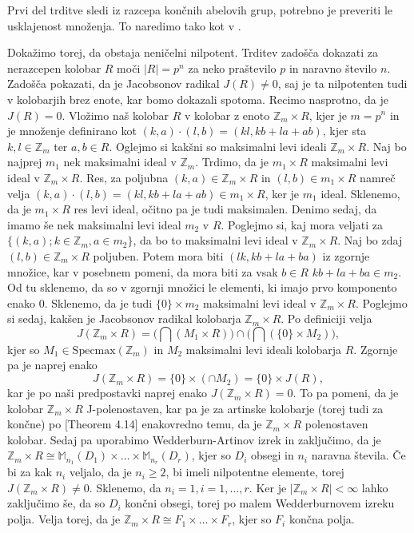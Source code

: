 \documentclass[a4paper, 12pt]{amsart}
\theoremstyle{definition} %
\theoremstyle{plain} %
\newcommand{\Z}{\mathbb Z}
\newcommand{\M}{\mathbb M}
\begin{document}
\proof
Prvi del trditve sledi iz razcepa končnih abelovih grup, potrebno je preveriti le usklajenost množenja. To naredimo tako kot v  \cite[Lema 2.3]{diploma}. 

Dokažimo torej, da obstaja neničelni nilpotent. Trditev zadošča dokazati za nerazcepen kolobar $R$ moči $|R|=p^n$ za neko praštevilo $p$ in naravno število $n$. Zadošča pokazati, da je Jacobsonov radikal $J(R)\neq 0$, saj je ta nilpotenten tudi v kolobarjih brez enote, kar bomo dokazali spotoma. Recimo nasprotno, da je $J(R) = 0$. Vložimo naš kolobar $R$ v kolobar z enoto $\Z_m \times R$, kjer je $m=p^n$ in je množenje definirano kot $(k,a)\cdot (l,b) = (kl,kb+la+ab)$, kjer sta $k,l\in \Z_m$ ter $a,b\in R$. Oglejmo si kakšni so maksimalni levi ideali $\Z_m \times R$. Naj bo najprej $m_1$ nek maksimalni ideal v $\Z_m$. Trdimo, da je $m_1\times R$ maksimalni levi ideal v $\Z_m \times R$. Res, za poljubna $(k,a)\in \Z_m \times R$ in $(l,b)\in m_1 \times R$ namreč velja $(k,a)\cdot (l,b) = (kl, kb+ la+ab)\in m_1 \times R$, ker je $m_1$ ideal. Sklenemo, da je $m_1\times R$ res levi ideal, očitno pa je tudi maksimalen. Denimo sedaj, da imamo še nek maksimalni levi ideal $m_2$ v $R$. Poglejmo si, kaj mora veljati za $\{(k,a); k\in \Z_m, a\in m_2\}$, da bo to maksimalni levi ideal v $\Z_m\times R$. Naj bo zdaj $(l,b)\in \Z_m \times R$ poljuben. Potem mora biti $(lk, kb+la+ba)$ iz zgornje množice, kar v posebnem pomeni, da mora biti za vsak $b\in R$ $kb+la+ba\in m_2$. Od tu sklenemo, da so v zgornji množici le elementi, ki imajo prvo komponento enako 0. Sklenemo, da je tudi $\{0\}\times m_2$ maksimalni levi ideal v $\Z_m \times R$. Poglejmo si sedaj, kakšen je Jacobsonov radikal kolobarja $\Z_m\times R$. Po definiciji velja
$$
J(\Z_m\times R) = \big(\bigcap (M_1\times R)\big) \cap\big (\bigcap (\{0\}\times M_2)\big),
$$
kjer so $M_1\in \text{Specmax}(\Z_m)$ in $M_2$ maksimalni levi ideali kolobarja $R$. Zgornje pa je naprej enako
$$
J(\Z_m \times R) = \{0\}\times (\cap M_2) = \{0 \} \times J(R),
$$
kar je po naši predpostavki naprej enako $J(\Z_m\times R) = 0$. To pa pomeni, da je kolobar $\Z_m\times R$ J-polenostaven, kar pa je za artinske kolobarje (torej tudi za končne) po \cite{Lam}[Theorem 4.14] enakovredno temu, da je $\Z_m \times R$ polenostaven kolobar. Sedaj pa uporabimo Wedderburn-Artinov izrek in zaključimo, da je $\Z_m \times R \cong \M_{n_1} (D_1)\times \dots \times\M_{n_r}(D_r)$, kjer so $D_i$ obsegi in $n_i$ naravna števila. Če bi za kak $n_i$ veljalo, da je $n_i\ge 2$, bi imeli nilpotentne elemente, torej $J(\Z_m\times R) \neq 0$. Sklenemo, da $n_i = 1, i=1,\dots,r$. Ker je $|\Z_m\times R|<\infty$ lahko zaključimo še, da so $D_i$ končni obsegi, torej po malem Wedderburnovem izreku polja. Velja torej, da je $\Z_m \times R \cong F_1 \times \dots \times F_r$, kjer so $F_i$ končna polja. 
\end{document}
